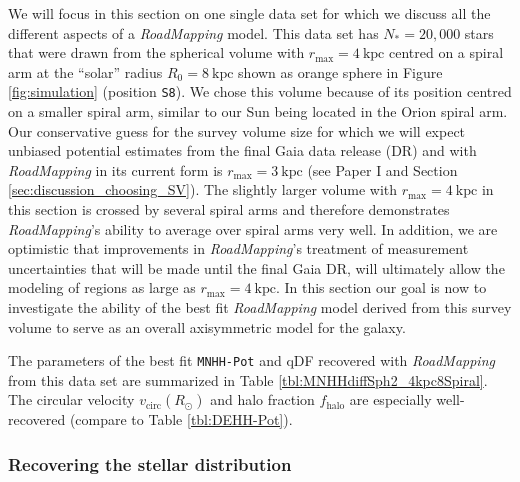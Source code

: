 \documentclass[iop,revtex4,numberedappendix,appendixfloats]{emulateapj}
\newcommand{\RM}{{\sl RoadMapping}}
\begin{document}
We will focus in this section on one single data set for which we discuss all the different aspects of a \RM{} model. This data set has $N_*=20,000$ stars that were drawn from the spherical volume with $r_\text{max}=4~\text{kpc}$ centred on a spiral arm at the ``solar'' radius $R_0=8~\text{kpc}$ shown as orange sphere in Figure \ref{fig:simulation} (position \texttt{S8}). We chose this volume because of its position centred on a smaller spiral arm, similar to our Sun being located in the Orion spiral arm. Our conservative guess for the survey volume size for which we will expect unbiased potential estimates from the final Gaia data release (DR) and with \RM{} in its current form is $r_\text{max}=3~\text{kpc}$ (see Paper I and Section \ref{sec:discussion_choosing_SV}). The slightly larger volume with $r_\text{max}=4~\text{kpc}$ in this section is crossed by several spiral arms and therefore demonstrates \RM{}'s ability to average over spiral arms very well. In addition, we are optimistic that improvements in \RM{}'s treatment of measurement uncertainties that will be made until the final Gaia DR, will ultimately allow the modeling of regions as large as $r_\text{max}=4~\text{kpc}$. In this section our goal is now to investigate the ability of the best fit \RM{} model derived from this survey volume to serve as an overall axisymmetric model for the galaxy.

The parameters of the best fit \texttt{MNHH-Pot} and qDF recovered with \RM{} from this data set are summarized in Table \ref{tbl:MNHHdiffSph2_4kpc8Spiral}. The circular velocity $v_\text{circ}(R_\odot)$ and halo fraction $f_\text{halo}$ are especially well-recovered (compare to Table \ref{tbl:DEHH-Pot}).

\subsubsection{Recovering the stellar distribution} \label{sec:4kpc8Spiral_DF}
\end{document}
